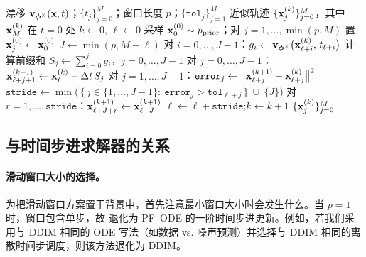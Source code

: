 \begin{algorithm}[t]
  \caption{带滑动窗口的 ParaDiGMS}
  \label{alg:paradigms}
  \begin{algorithmic}[1]
    \Require 漂移 ${\mathbf{v}}_{{\bm{\phi}}^\times}({\mathbf{x}},t)$；$\{t_j\}_{j=0}^{M}$；窗口长度 $p$；$\{\mathtt{tol}_j\}_{j=1}^{M}$
    \Ensure 近似轨迹 $\{{\mathbf{x}}^{(k)}_j\}_{j=0}^{M}$，其中 ${\mathbf{x}}^{(k)}_M$ 在 $t=0$ 处
    \State $k \gets 0$, $\ell \gets 0$ 
    \State 采样 ${\mathbf{x}}^{(0)}_0 \sim p_{\mathrm{prior}}$；对 $j=1,\ldots,\min(p,M)$ 置 ${\mathbf{x}}^{(0)}_j \gets {\mathbf{x}}^{(0)}_0$  \Statex {}
      \State $J \gets \min(p,  M-\ell)$   
      \State {} 
      \State 对 $i=0,\ldots,J-1$：$g_i \gets {\mathbf{v}}_{{\bm{\phi}}^\times} \big({\mathbf{x}}^{(k)}_{\ell+i},\, t_{\ell+i}\big)$ 
      \Statex {}
      \State 计算前缀和 $S_j \gets \sum_{i=0}^{j} g_i$，$j=0,\ldots,J-1$ 
      \Statex {}
      \State {} 
      \State 对 $j=0,\ldots,J-1$：$\displaystyle {\mathbf{x}}^{(k+1)}_{\ell+j+1} \gets {\mathbf{x}}^{(k)}_{\ell} - \Delta t\, S_j$ 
      \Statex {}
      \State {} 
      \State 对 $j=1,\ldots,J-1$：$\mathtt{error}_j \gets \big\|{\mathbf{x}}^{(k+1)}_{\ell+j}-{\mathbf{x}}^{(k)}_{\ell+j}\big\|^2$ \Statex {}
      \State $\displaystyle \mathtt{stride} \gets \min \Big(\,\{\,j\in\{1,\ldots,J-1\}:~\mathtt{error}_j>\mathtt{tol}_{\ell+j}\,\}\ \cup\ \{J\}\Big)$
      \State {} 
      \State 对 $r=1,\ldots,\mathtt{stride}$：${\mathbf{x}}^{(k+1)}_{\ell+J+r} \gets {\mathbf{x}}^{(k+1)}_{\ell+J}$ 
      \Statex {}
      \State $\ell \gets \ell + \mathtt{stride}$;\quad $k \gets k+1$
    \EndWhile
    \State \Return $\{{\mathbf{x}}^{(k)}_j\}_{j=0}^{M}$
  \end{algorithmic}
\end{algorithm}




\subsection{与时间步进求解器的关系}

\paragraph{滑动窗口大小的选择。}

为把滑动窗口方案置于背景中，首先注意最小窗口大小时会发生什么。当 $p=1$ 时，窗口包含单步，故
 退化为 PF--ODE 的一阶时间步进更新。例如，若我们采用与 DDIM 相同的 ODE 写法（如数据 vs. 噪声预测）并选择与 DDIM 相同的离散时间步调度，则该方法退化为 DDIM。

